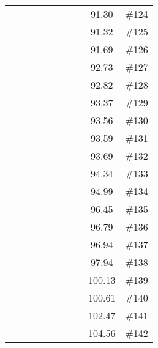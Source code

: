 \begin{longtable}{|c|c|c|c|c|c|c|c|c|c|}
 \x    & \x    &       & \x    &       & \x\m  &       &       & 91.30 & \#124 \\
 \x    & \x    &       & \x    & \x    & \x    &       & \x    & 91.32 & \#125 \\
 \x    & \x    &       & \x    &       &       &       & \x    & 91.69 & \#126 \\
 \x    & \x    & \x    &       &       & \x\m  &       &       & 92.73 & \#127 \\
 \x    & \x    &       & \x    &       &       & \x    &       & 92.82 & \#128 \\
 \x    & \x    &       & \x    &       & \x    & \x    &       & 93.37 & \#129 \\
 \x    & \x    &       & \x    &       &       & \x\m  &       & 93.56 & \#130 \\
 \x    & \x    &       & \x    &       & \x    &       & \x    & 93.59 & \#131 \\
 \x    & \x    &       & \x    &       &       &       &       & 93.69 & \#132 \\
 \x    & \x    &       &       &       &       &       & \x    & 94.34 & \#133 \\
 \x    & \x    &       &       &       &       &       &       & 94.99 & \#134 \\
 \x    & \x    &       & \x    &       &       &       & \x\m  & 96.45 & \#135 \\
 \x    & \x    &       &       &       & \x\m  &       &       & 96.79 & \#136 \\
 \x    & \x    &       &       &       &       & \x\m  &       & 96.94 & \#137 \\
 \x    & \x    &       &       &       & \x    &       &       & 97.94 & \#138 \\
 \x    & \x    &       & \x    &       & \x\m  &       & \x\m  & 100.13 & \#139 \\
 \x    & \x    &       & \x    &       & \x\m  & \x\m  &       & 100.61 & \#140 \\
 \x    & \x    &       &       &       & \x\m  & \x\m  &       & 102.47 & \#141 \\
 \x    & \x    &       &       &       & \x    &       & \x    & 104.56 & \#142 \\
\end{longtable}
\normalsize